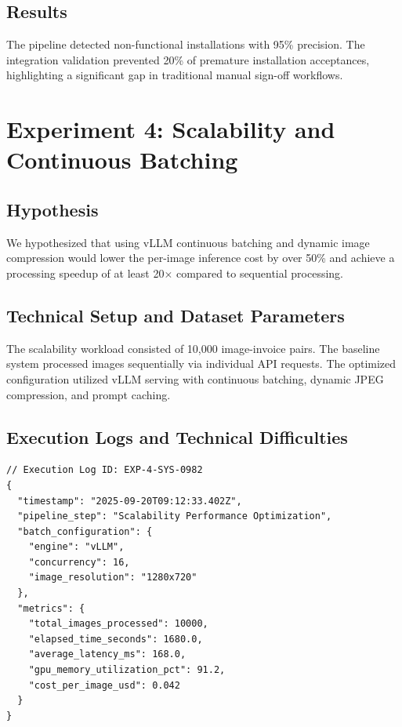 \documentclass[11pt,letterpaper]{report}
\begin{document}
\subsection{Results}
The pipeline detected non-functional installations with 95\% precision. The integration validation prevented 20\% of premature installation acceptances, highlighting a significant gap in traditional manual sign-off workflows.

\section{Experiment 4: Scalability and Continuous Batching}

\subsection{Hypothesis}
We hypothesized that using vLLM continuous batching and dynamic image compression would lower the per-image inference cost by over 50\% and achieve a processing speedup of at least 20$\times$ compared to sequential processing.

\subsection{Technical Setup and Dataset Parameters}
The scalability workload consisted of 10,000 image-invoice pairs. The baseline system processed images sequentially via individual API requests. The optimized configuration utilized vLLM serving with continuous batching, dynamic JPEG compression, and prompt caching.

\subsection{Execution Logs and Technical Difficulties}

\begin{listing}[htbp]
\begin{verbatim}
// Execution Log ID: EXP-4-SYS-0982
{
  "timestamp": "2025-09-20T09:12:33.402Z",
  "pipeline_step": "Scalability Performance Optimization",
  "batch_configuration": {
    "engine": "vLLM",
    "concurrency": 16,
    "image_resolution": "1280x720"
  },
  "metrics": {
    "total_images_processed": 10000,
    "elapsed_time_seconds": 1680.0,
    "average_latency_ms": 168.0,
    "gpu_memory_utilization_pct": 91.2,
    "cost_per_image_usd": 0.042
  }
}
\end{verbatim}
\caption{System execution log demonstrating high-throughput performance metrics under continuous batching.}
\label{lst:log_batching}
\end{listing}
\end{document}
